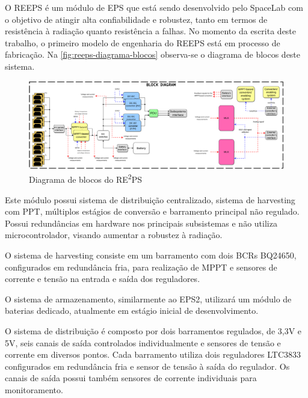 O \gls{REEPS} é um módulo de \gls{EPS} que está sendo desenvolvido pelo SpaceLab com o objetivo de atingir alta confiabilidade e robustez, tanto em termos de resistência à radiação quanto resistência a falhas.
No momento da escrita deste trabalho, o primeiro modelo de engenharia do \gls{REEPS} está em processo de fabricação.
Na \autoref{fig:reeps-diagrama-blocos} observa-se o diagrama de blocos deste sistema.

\begin{figure}[htp]
    \caption{Diagrama de blocos do RE\textsuperscript{2}PS}
    \begin{center}
        \includegraphics[width=\textwidth, keepaspectratio]{images/reeps-block-diagram.png}
    \end{center}
    \label{fig:reeps-diagrama-blocos}
\end{figure}

Este módulo possui sistema de distribuição centralizado, sistema de harvesting com \gls{PPT}, múltiplos estágios de conversão e barramento principal não regulado.
Possui redundâncias em hardware nos principais subsistemas e não utiliza microcontrolador, visando aumentar a robustez à radiação.

O sistema de harvesting consiste em um barramento com dois \gls{BCR}s BQ24650, configurados em redundância fria, para realização de \gls{MPPT} e sensores de corrente e tensão na entrada e saída dos reguladores.

O sistema de armazenamento, similarmente ao \gls{EPS2}, utilizará um módulo de baterias dedicado, atualmente em estágio inicial de desenvolvimento.

O sistema de distribuição é composto por dois barramentos regulados, de 3,3V e 5V, seis canais de saída controlados individualmente e sensores de tensão e corrente em diversos pontos.
Cada barramento utiliza dois reguladores LTC3833 configurados em redundância fria e sensor de tensão à saída do regulador. Os canais de saída possui também sensores de corrente individuais para monitoramento.

